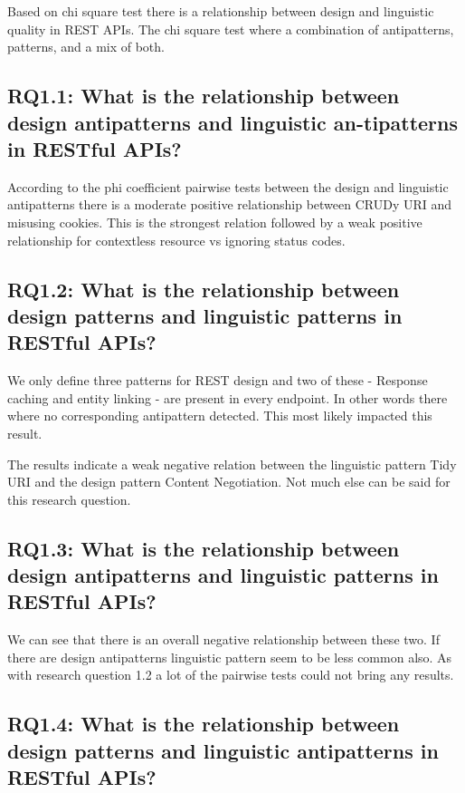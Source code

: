 \documentclass[a4paper,12pt]{article}
\begin{document}
Based on chi square test there is a relationship between design and linguistic quality in REST APIs. The chi square test where a combination of antipatterns, patterns, and a mix of both.

\subsection{RQ1.1: What is the relationship between design antipatterns and linguistic an-tipatterns in RESTful APIs?}

According to the phi coefficient pairwise tests between the design and linguistic antipatterns there is a moderate positive relationship between CRUDy URI and misusing cookies. This is the strongest relation followed by a weak positive relationship for contextless resource vs ignoring status codes.

\subsection{RQ1.2:  What is the relationship between design patterns and linguistic patterns in RESTful APIs?}

We only define three patterns for REST design and two of these - Response caching and  entity linking - are present in every endpoint. In other words there where no corresponding antipattern detected. This most likely impacted this result. 

The results indicate a weak negative relation between the linguistic pattern Tidy URI and the design pattern Content Negotiation. Not much else can be said for this research question.

\subsection{ RQ1.3: What is the relationship between design antipatterns and linguistic patterns in RESTful APIs?}

We can see that there is an overall negative relationship between these two. If there are design antipatterns linguistic pattern seem to be less common also. As with research question 1.2 a lot of the pairwise tests could not bring any results.

\subsection{RQ1.4: What is the relationship between design patterns and linguistic antipatterns in RESTful APIs?}
\end{document}
